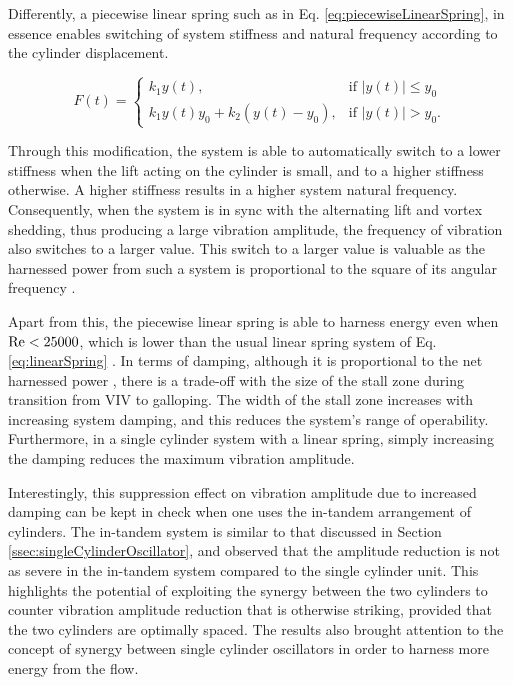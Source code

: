\documentclass[oneside]{utmthesis}
\begin{document}
Differently, a piecewise linear spring such as in Eq. \ref{eq:piecewiseLinearSpring}, in essence enables switching of system stiffness and natural frequency according to the cylinder displacement.

\begin{equation}
  F(t)=\begin{cases}
    k_{1} y(t),                              & \text{if $|y(t)| \leq y_{0}$}\\
    k_{1} y(t) y_{0} + k_{2} (y(t) - y_{0}), & \text{if $|y(t)| > y_{0}$}.
  \end{cases}
  \label{eq:piecewiseLinearSpring}
\end{equation}

\noindent Through this modification, the system is able to automatically switch to a lower stiffness when the lift acting on the cylinder is small, and to a higher stiffness otherwise. A higher stiffness results in a higher system natural frequency. Consequently, when the system is in sync with the alternating lift and vortex shedding, thus producing a large vibration amplitude, the frequency of vibration also switches to a larger value. This switch to a larger value is valuable as the harnessed power from such a system is proportional to the square of its angular frequency \citep{Ma2018}.

Apart from this, the piecewise linear spring is able to harness energy even when $\text{Re} < 25000$, which is lower than the usual linear spring system of Eq. \ref{eq:linearSpring} \citep{Sun2016}. In terms of damping, although it is proportional to the net harnessed power \citep{Ma2018}, there is a trade-off with the size of the stall zone during transition from VIV to galloping. The width of the stall zone increases with increasing system damping, and this reduces the system's range of operability. Furthermore, in a single cylinder system with a linear spring, simply increasing the damping reduces the maximum vibration amplitude.

Interestingly, this suppression effect on vibration amplitude due to increased damping can be kept in check when one uses the in-tandem arrangement of cylinders. The in-tandem system is similar to that discussed in Section \ref{ssec:singleCylinderOscillator}, and \citet{Sun2019b} observed that the amplitude reduction is not as severe in the in-tandem system compared to the single cylinder unit. This highlights the potential of exploiting the synergy between the two cylinders to counter vibration amplitude reduction that is otherwise striking, provided that the two cylinders are optimally spaced. The results also brought attention to the concept of synergy between single cylinder oscillators in order to harness more energy from the flow.
\end{document}
